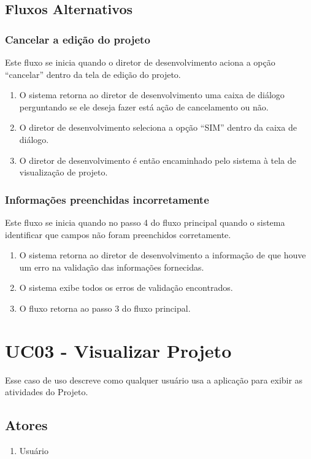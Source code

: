 \subsection{Fluxos Alternativos}

\subsubsection{Cancelar a edição do projeto}
Este fluxo se inicia quando o diretor de desenvolvimento aciona a opção “cancelar” dentro da tela de edição do projeto.

\begin{enumerate}
  \item O sistema retorna ao diretor de desenvolvimento uma caixa de diálogo perguntando se ele deseja fazer está ação de cancelamento ou não.
  \item O diretor de desenvolvimento seleciona a opção “SIM” dentro da caixa de diálogo.
  \item O diretor de desenvolvimento é então encaminhado pelo sistema à tela de visualização de projeto.
\end{enumerate}

\subsubsection{Informações preenchidas incorretamente}
Este fluxo se inicia quando no passo 4 do fluxo principal quando o sistema identificar que campos não foram preenchidos corretamente.

\begin{enumerate}
  \item O sistema retorna ao diretor de desenvolvimento a informação de que houve um erro na validação das informações fornecidas.
  \item O sistema exibe todos os erros de validação encontrados.
  \item O fluxo retorna ao passo 3 do fluxo principal. 
\end{enumerate}

\section{UC03 - Visualizar Projeto}

Esse caso de uso descreve como qualquer usuário usa a aplicação para exibir as atividades do Projeto.

\subsection{Atores}
\begin{enumerate}
  \item Usuário 
\end{enumerate}
